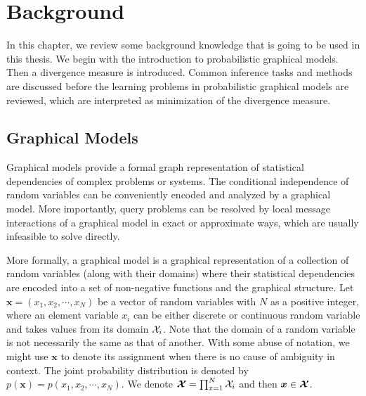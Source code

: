 \chapter{Background}
\label{chapter2}
In this chapter, we review some background knowledge that is going to be used in this thesis. We begin with the introduction to probabilistic graphical models. Then a divergence measure is introduced. Common inference tasks and methods are discussed before the learning problems in probabilistic graphical models are reviewed, which are interpreted as minimization of the divergence measure.

\section{Graphical Models}
\label{chpt2:sec:graphical-models}
Graphical models provide a formal graph representation of statistical dependencies of complex problems or systems. The conditional independence of random variables can be conveniently encoded and analyzed by a graphical model. More importantly, query problems can be resolved by local message interactions of a graphical model in exact or approximate ways, which are usually infeasible to solve directly.

More formally, a graphical model is a graphical representation of a collection of random variables (along with their domains) where their statistical dependencies are encoded into a set of non-negative functions and the graphical structure. Let $\bm{x}= (x_1, x_2, \cdots, x_N)$ be a vector of random variables with $N$ as a positive integer, where an element variable $x_i$ can be either discrete or continuous random variable and takes values from its domain $\mathcal{X}_i$. Note that the domain of a random variable is not necessarily the same as that of another. With some abuse of notation, we might use $\bm{x}$ to denote its assignment when there is no cause of ambiguity in context. The joint probability distribution is denoted by $p(\bm{x})=p(x_1, x_2, \cdots, x_N)$.
We denote $\bm{\mathcal{X}} = \prod_{x=1}^{N} \mathcal{X}_i$ and then $\bm{x}\in \bm{\mathcal{X}}$.

